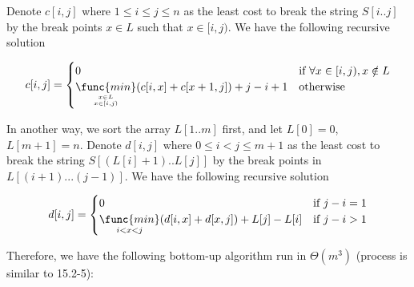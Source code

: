 \noindent
Denote $c[i,j]$ where $1 \leq i \leq j \leq n$
as the least cost to break the string $S[i..j]$
by the break points $x \in L$ such that $x \in [i,j)$.
We have the following recursive solution

\begin{equation*}
    c[i,j] = 
    \begin{cases}
        0 & \text{if } \forall x \in [i,j), x \notin L \\
        \mathop{\func{min}}\limits_{x \in L 
            \atop x \in [i,j)}
            (c[i,x] + c[x+1,j])+j-i+1
            & \text{otherwise}
    \end{cases}
\end{equation*}

\noindent
In another way, we sort the array $L[1..m]$ first,
and let $L[0] = 0$, $L[m+1] = n$.
Denote $d[i,j]$ where $0 \leq i < j \leq m+1$ 
as the least cost to break the string $S[(L[i]+1)..L[j]]$
by the break points in $L[(i+1)...(j-1)]$.
We have the following recursive solution

\begin{equation*}
    d[i,j] = 
    \begin{cases}
        0 & \text{if } j - i = 1 \\
        \mathop{\func{min}}\limits_{i < x < j}
            (d[i,x] + d[x,j])+L[j]-L[i]
            & \text{if } j - i > 1
    \end{cases}
\end{equation*}

\noindent
Therefore, we have the following bottom-up algorithm run in $\Theta(m^3)$
(process is similar to 15.2-5):

